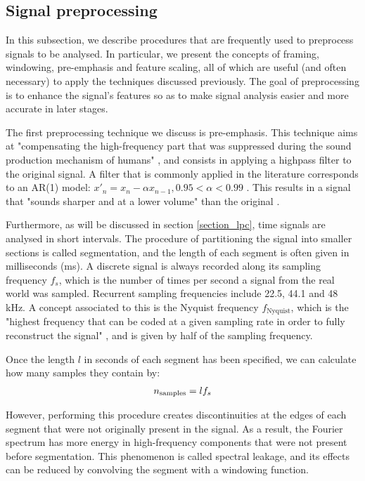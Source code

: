 \documentclass[../main.tex]{subfiles}
\begin{document}
\subsection{Signal preprocessing} \label{subsection_preproc}
In this subsection, we describe procedures that are frequently used to preprocess signals to be analysed. In particular, we present the concepts of framing, windowing, pre-emphasis and feature scaling, all of which are useful (and often necessary) to apply the techniques discussed previously. The goal of preprocessing is to enhance the signal's features so as to make signal analysis easier and more accurate in later stages.
\par The first preprocessing technique we discuss is pre-emphasis. This technique aims at "compensating the high-frequency part that was suppressed during the sound production mechanism of humans" \cite{Jang1996}, and consists in applying a highpass filter to the original signal. A filter that is commonly applied in the literature corresponds to an AR(1) model: $x'_n = x_n - \alpha x_{n-1}, 0.95< \alpha < 0.99 $ \cite{Shimodaira2013}. This results in a signal that "sounds sharper and at a lower volume" than the original \cite{Jang1996}. 
\par Furthermore, as will be discussed in section \ref{section_lpc}, time signals are analysed in short intervals. The procedure of partitioning the signal into smaller sections is called segmentation, and the length of each segment is often given in milliseconds (ms). A discrete signal is always recorded along its sampling frequency $f_s$, which is the number of times per second a signal from the real world was sampled. Recurrent sampling frequencies include 22.5, 44.1 and 48 kHz. A concept associated to this is the Nyquist frequency $f_{\text{Nyquist}}$, which is the "highest frequency that can be coded at a given sampling rate in order to fully reconstruct the signal" \cite{Weisstein2015b}, and is given by half of the sampling frequency.
\par Once the length $l$ in seconds of each segment has been specified, we can calculate how many samples they contain by:
\begin{align*}
n_{\text{samples}} = l \* f_s
\end{align*}
\par However, performing this procedure creates discontinuities at the edges of each segment that were not originally present in the signal. As a result, the Fourier spectrum has more energy in high-frequency components \cite{NationalInstruments2015} that were not present before segmentation. This phenomenon is called spectral leakage, and its effects can be reduced by convolving the segment with a windowing function. 
\end{document}
